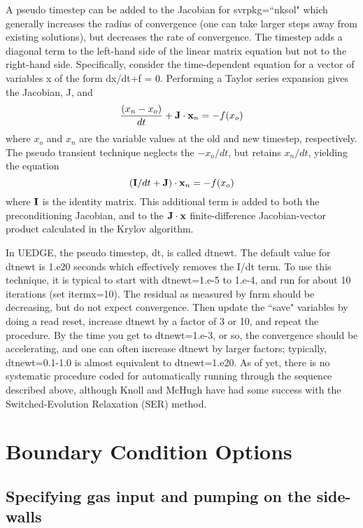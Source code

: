 \documentclass [12pt]{article}
\begin{document}
A pseudo timestep can be added to the Jacobian for svrpkg=``nksol" which
generally increases the radius of convergence (one can take larger steps
away from existing solutions), but decreases the rate of convergence.  The
timestep adds a diagonal term to the left-hand side of the linear matrix
equation but not to the right-hand side.  Specifically, consider the
time-dependent equation for a vector of variables x of the form dx/dt+f = 0.
Performing a Taylor series expansion gives the Jacobian, J, and
\begin{equation}
  \frac{(x_n - x_o)}{dt} + {\bf J}\cdot {\bf x}_n = -f(x_o)
\end{equation}
where $x_o$ and $x_n$ are the variable values at the old and new timestep,
respectively. The pseudo transient technique neglects the $-x_o/dt$, but
retains $x_n/dt$, yielding the equation
\begin{equation}
  ({\bf I}/dt + {\bf J})\cdot {\bf x}_n = -f(x_o)
\end{equation}
where ${\bf I}$ is the identity matrix.  This additional term is added to both
the preconditioning Jacobian, and to the ${\bf J}\cdot {\bf x}$
finite-difference Jacobian-vector product calculated in the Krylov algorithm.

In {\sf UEDGE}, the pseudo timestep, dt, is called dtnewt.  The default value
for dtnewt is 1.e20 seconds which effectively removes the I/dt term.  To use
this technique, it is typical to start with dtnewt=1.e-5 to 1.e-4, and run for
about 10 iterations (set itermx=10). The residual as measured by fnrm should
be decreasing, but do not expect convergence.  Then update the ``save"
variables by doing a {\sf read reset}, increase dtnewt by a factor of 3 or 10,
and repeat the procedure.  By the time you get to dtnewt=1.e-3, or so, the
convergence should be accelerating, and one can often increase dtnewt by
larger factors; typically, dtnewt=0.1-1.0 is almost equivalent to
dtnewt=1.e20.  As of yet, there is no systematic procedure coded for
automatically running through the sequence described above, although Knoll and
McHugh have had some success with the Switched-Evolution Relaxation (SER)
method.


\section{Boundary Condition Options}

\subsection{Specifying gas input and pumping on the side-walls}
\end{document}

